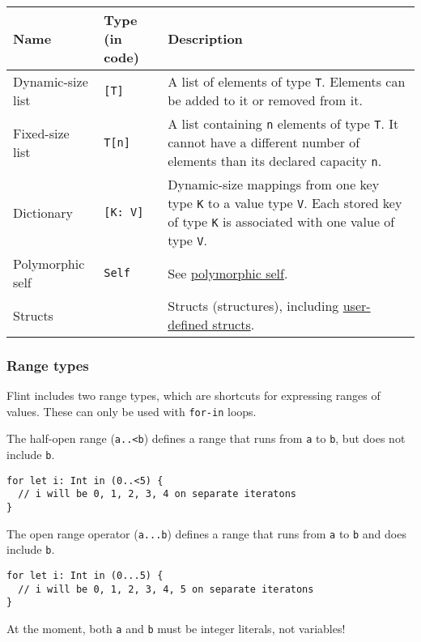 \begin{tabularx}{\textwidth}{llX}
	Name & Type (in code) & Description\\\hline
	Dynamic-size list & \texttt{[T]} & A list of elements of type \texttt{T}. Elements can be added to it or removed from it.\\
	Fixed-size list & \texttt{T[n]} & A list containing \texttt{n} elements of type \texttt{T}. It cannot have a different number of elements than its declared capacity \texttt{n}.\\
	Dictionary & \texttt{[K: V]} & Dynamic-size mappings from one key type \texttt{K} to a value type \texttt{V}. Each stored key of type \texttt{K} is associated with one value of type \texttt{V}.\\
	Polymorphic self & \texttt{Self} & See \hyperref[sec:appendix-b-polymorphic-self]{polymorphic self}.\\
	Structs & & Structs (structures), including \hyperref[sec:appendix-b-structs]{user-defined structs}.
\end{tabularx}

\subsubsection{Range types}
\label{sec:appendix-b-range-types}

Flint includes two range types, which are shortcuts for expressing ranges of values. These can only be used with \texttt{for-in} loops.

The half-open range (\texttt{a..<b}) defines a range that runs from \texttt{a} to \texttt{b}, but does not include \texttt{b}.

\begin{verbatim}
for let i: Int in (0..<5) {
  // i will be 0, 1, 2, 3, 4 on separate iteratons
}
\end{verbatim}

The open range operator (\texttt{a...b}) defines a range that runs from \texttt{a} to \texttt{b} and does include \texttt{b}.

\begin{verbatim}
for let i: Int in (0...5) {
  // i will be 0, 1, 2, 3, 4, 5 on separate iteratons
}
\end{verbatim}

At the moment, both \texttt{a} and \texttt{b} must be integer literals, not variables!

